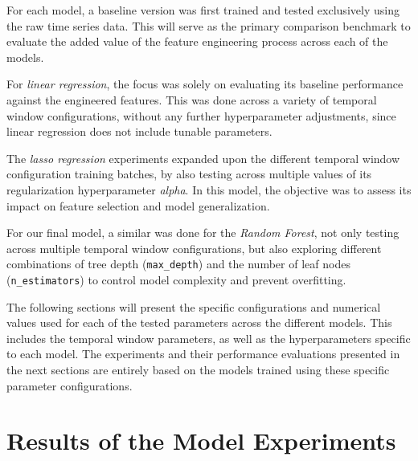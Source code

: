 \documentclass[12pt]{report} %
\begin{document}
For each model, a baseline version was first trained and tested exclusively using the raw time series data. This will serve as the primary comparison benchmark to evaluate the added value of the feature engineering process across each of the models.

For \textit{linear regression}, the focus was solely on evaluating its baseline performance against the engineered features. This was done across a variety of temporal window configurations, without any further hyperparameter adjustments, since linear regression does not include tunable parameters.

The \textit{lasso regression} experiments expanded upon the different temporal window configuration training batches, by also testing across multiple values of its regularization hyperparameter \textit{alpha}. In this model, the objective was to assess its impact on feature selection and model generalization.

For our final model, a similar was done for the \textit{Random Forest}, not only testing across multiple temporal window configurations, but also exploring different combinations of tree depth (\verb|max_depth|) and the number of leaf nodes (\verb|n_estimators|) to control model complexity and prevent overfitting.

The following sections will present the specific configurations and numerical values used for each of the tested parameters across the different models. This includes the temporal window parameters, as well as the hyperparameters specific to each model. The experiments and their performance evaluations presented in the next sections are entirely based on the models trained using these specific parameter configurations.


\section{Results of the Model Experiments}


\end{document}
